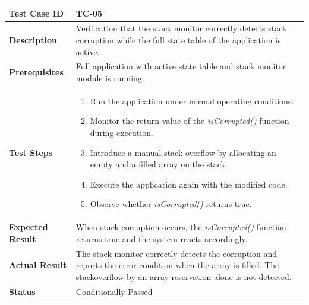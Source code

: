 \begin{table}[H]
\centering
\begin{tabular}{|p{3cm}|p{12cm}|}
\hline
\textbf{Test Case ID} & TC-05 \\ \hline
\textbf{Description} & Verification that the stack monitor correctly detects stack corruption while the full state table of the application is active. \\ \hline
\textbf{Prerequisites} & Full application with active state table and stack monitor module is running. \\ \hline
\textbf{Test Steps} &
\begin{enumerate}
\item Run the application under normal operating conditions.
\item Monitor the return value of the \textit{isCorrupted()} function during execution.
\item Introduce a manual stack overflow by allocating an empty and a filled array on the stack.
\item Execute the application again with the modified code.
\item Observe whether \textit{isCorrupted()} returns true.
\end{enumerate}
\\ \hline
\textbf{Expected Result} & When stack corruption occurs, the \textit{isCorrupted()} function returns true and the system reacts accordingly. \\ \hline
\textbf{Actual Result} & The stack monitor correctly detects the corruption and reports the error condition when the array is filled. The stackoverflow by an array reservation alone is not detected.  \\ \hline
\textbf{Status} & \textcolor{orange!60!black}{Conditionally Passed} \\ \hline
\end{tabular}
\end{table}
